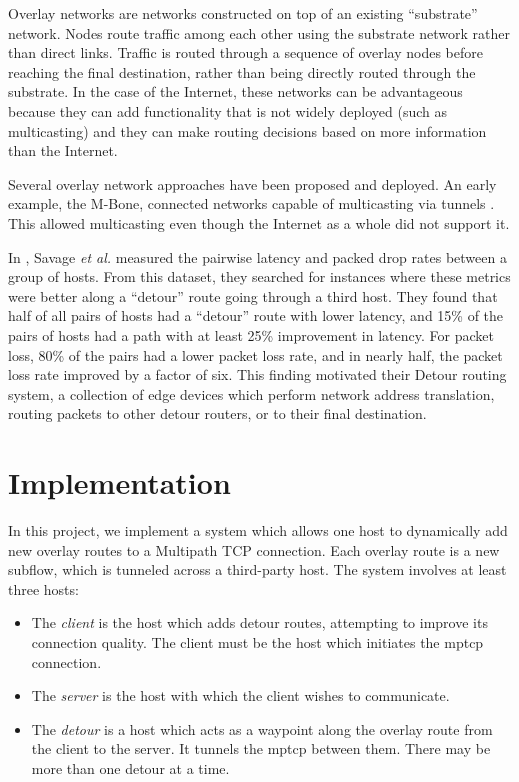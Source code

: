 \documentclass{cwru}
\begin{document}
Overlay networks are networks constructed on top of an existing ``substrate''
network. Nodes route traffic among each other using the substrate network rather
than direct links. Traffic is routed through a sequence of overlay nodes before
reaching the final destination, rather than being directly routed through the
substrate. In the case of the Internet, these networks can be advantageous
because they can add functionality that is not widely deployed (such as
multicasting) and they can make routing decisions based on more information than
the Internet.

Several overlay network approaches have been proposed and deployed. An early
example, the M-Bone, connected networks capable of multicasting via tunnels
\cite{mbone}. This allowed multicasting even though the Internet as a whole did
not support it. %

In \cite{detour}, Savage \textit{et al.} measured the pairwise latency and
packed drop rates between a group of hosts. From this dataset, they searched for
instances where these metrics were better along a ``detour'' route going through
a third host. They found that half of all pairs of hosts had a ``detour'' route
with lower latency, and 15\% of the pairs of hosts had a path with at least 25\%
improvement in latency. For packet loss, 80\% of the pairs had a lower packet
loss rate, and in nearly half, the packet loss rate improved by a factor of six.
This finding motivated their Detour routing system, a collection of edge devices
which perform network address translation, routing packets to other detour
routers, or to their final destination.


\chapter{Implementation}


In this project, we implement a system which allows one host to dynamically add
new overlay routes to a Multipath TCP connection. Each overlay route is a new
subflow, which is tunneled across a third-party host. The system involves at
least three hosts:
\begin{itemize}
\item The \emph{client} is the host which adds detour routes, attempting to
  improve its connection quality. The client must be the host which initiates
  the \ac{mptcp} connection.
\item The \emph{server} is the host with which the client wishes to communicate.
\item The \emph{detour} is a host which acts as a waypoint along the overlay
  route from the client to the server. It tunnels the \ac{mptcp} between them. There
  may be more than one detour at a time.
\end{itemize}
\end{document}
